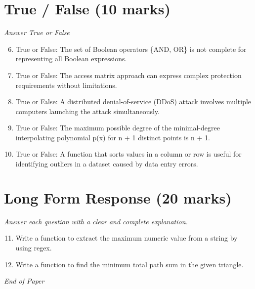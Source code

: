 \documentclass[12pt]{article}
\begin{document}
\section*{True / False (10 marks)}
\textit{Answer True or False}
\begin{enumerate}[label=\arabic*.]
\setcounter{enumi}{5}
\item True or False: The set of Boolean operators \{AND, OR\} is not complete for representing all Boolean expressions.
\item True or False: The access matrix approach can express complex protection requirements without limitations.
\item True or False: A distributed denial-of-service (DDoS) attack involves multiple computers launching the attack simultaneously.
\item True or False: The maximum possible degree of the minimal-degree interpolating polynomial p(x) for n + 1 distinct points is n + 1.
\item True or False: A function that sorts values in a column or row is useful for identifying outliers in a dataset caused by data entry errors.
\end{enumerate}

\section*{Long Form Response (20 marks)}
\textit{Answer each question with a clear and complete explanation.}
\begin{enumerate}[label=\arabic*.]
\setcounter{enumi}{10}
\item Write a function to extract the maximum numeric value from a string by using regex.
\item Write a function to find the minimum total path sum in the given triangle.
\end{enumerate}

\vfill
\noindent\textit{End of Paper}
\end{document}
